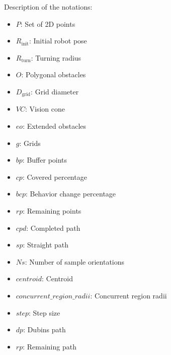     Description of the notations:
    \begin{itemize}[noitemsep,topsep=0pt]
        \item $P$: Set of 2D points
        \item $R_{\text{init}}$: Initial robot pose
        \item $R_{\text{turn}}$: Turning radius
        \item $O$: Polygonal obstacles
        \item $D_{\text{grid}}$: Grid diameter
        \item $VC$: Vision cone
        \item $eo$: Extended obstacles
        \item $g$: Grids
        \item $bp$: Buffer points
        \item $cp$: Covered percentage
        \item $bcp$: Behavior change percentage
        \item $rp$: Remaining points
        \item $cpd$: Completed path
        \item $sp$: Straight path
        \item $Ns$: Number of sample orientations
        \item $centroid$: Centroid
        \item $concurrent\_region\_radii$: Concurrent region radii
        \item $step$: Step size
        \item $dp$: Dubins path
        \item $rp$: Remaining path
    \end{itemize}

    






